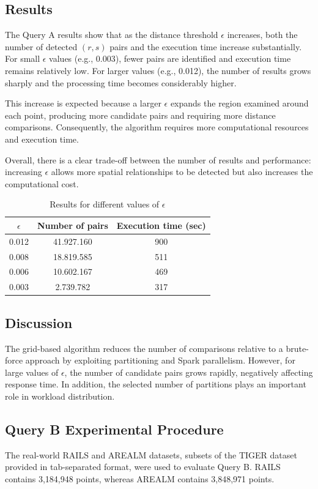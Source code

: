 \documentclass[sigconf,nonacm]{acmart}
\begin{document}
\subsection{Results}
The Query A results show that as the distance threshold $\epsilon$ increases, both the number of detected $(r,s)$ pairs and the execution time increase substantially. For small $\epsilon$ values (e.g., 0.003), fewer pairs are identified and execution time remains relatively low. For larger values (e.g., 0.012), the number of results grows sharply and the processing time becomes considerably higher.

This increase is expected because a larger $\epsilon$ expands the region examined around each point, producing more candidate pairs and requiring more distance comparisons. Consequently, the algorithm requires more computational resources and execution time.

Overall, there is a clear trade-off between the number of results and performance: increasing $\epsilon$ allows more spatial relationships to be detected but also increases the computational cost.

\begin{table}[t]
\centering
\caption{Results for different values of $\epsilon$}\label{tab:results}
\begin{tabular}{ccc}
\toprule
$\epsilon$ & Number of pairs & Execution time (sec) \\
\midrule
0.012 & 41.927.160 & 900 \\
0.008 & 18.819.585 &  511\\
0.006 & 10.602.167 & 469 \\
0.003 & 2.739.782 & 317 \\
\bottomrule
\end{tabular}
\end{table}

\subsection{Discussion}
The grid-based algorithm reduces the number of comparisons relative to a brute-force approach by exploiting partitioning and Spark parallelism. However, for large values of $\epsilon$, the number of candidate pairs grows rapidly, negatively affecting response time. In addition, the selected number of partitions plays an important role in workload distribution.

\subsection{Query B Experimental Procedure}
The real-world RAILS and AREALM datasets, subsets of the TIGER dataset provided in tab-separated format, were used to evaluate Query B. RAILS contains 3,184,948 points, whereas AREALM contains 3,848,971 points.
\end{document}
